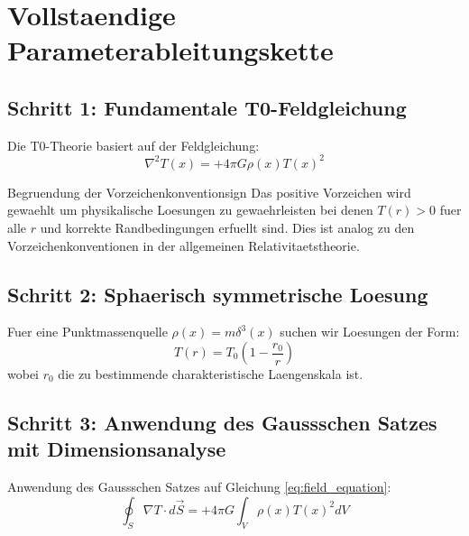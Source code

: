 \documentclass[12pt,a4paper]{article}
\begin{document}
	\section{Vollstaendige Parameterableitungskette}
	
	\subsection{Schritt 1: Fundamentale T0-Feldgleichung}
	
	Die T0-Theorie basiert auf der Feldgleichung:
	\begin{equation}
		\nabla^2 T(x) = +4\pi G \rho(x) T(x)^2
		\label{eq:field_equation}
	\end{equation}
	
	\begin{important}{Begruendung der Vorzeichenkonvention}{sign}
		Das positive Vorzeichen wird gewaehlt um physikalische Loesungen zu gewaehrleisten bei denen $T(r) > 0$ fuer alle $r$ und korrekte Randbedingungen erfuellt sind. Dies ist analog zu den Vorzeichenkonventionen in der allgemeinen Relativitaetstheorie.
	\end{important}
	
	\subsection{Schritt 2: Sphaerisch symmetrische Loesung}
	
	Fuer eine Punktmassenquelle $\rho(x) = m \delta^3(x)$ suchen wir Loesungen der Form:
	\begin{equation}
		T(r) = T_0 \left(1 - \frac{r_0}{r}\right)
		\label{eq:solution_form}
	\end{equation}
	wobei $r_0$ die zu bestimmende charakteristische Laengenskala ist.
	
	\subsection{Schritt 3: Anwendung des Gaussschen Satzes mit Dimensionsanalyse}
	
	Anwendung des Gaussschen Satzes auf Gleichung \eqref{eq:field_equation}:
	\begin{equation}
		\oint_S \nabla T \cdot d\vec{S} = +4\pi G \int_V \rho(x) T(x)^2 dV
		\label{eq:gauss_law}
	\end{equation}
	
\end{document}
